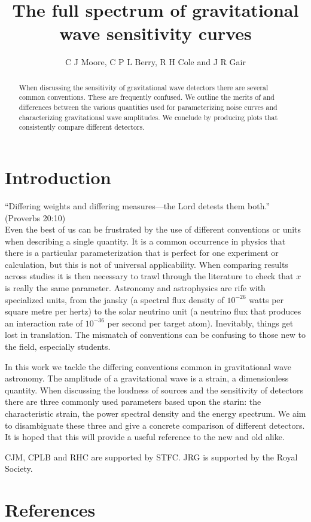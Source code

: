 \documentclass[12pt]{iopart}
\begin{document}
\title[GW sensitivity curves]{The full spectrum of gravitational wave sensitivity curves}

\author{C J Moore, C P L Berry, R H Cole and J R Gair}

\address{Institute of Astronomy, Madingley Road, Cambridge, CB3 0DS, United Kingdom}

\begin{abstract}
When discussing the sensitivity of gravitational wave detectors there are several common conventions. These are frequently confused. We outline the merits of and differences between the various quantities used for parameterizing noise curves and characterizing gravitational wave amplitudes. We conclude by producing plots that consistently compare different detectors.
\end{abstract}

\submitto{\CQG}
\maketitle

\section{Introduction}

``Differing weights and differing measures---the {\sc Lord} detests them both.'' (Proverbs 20:10)\\

\noindent{}Even the best of us can be frustrated by the use of different conventions or units when describing a single quantity. It is a common occurrence in physics that  there is a particular parameterization that is perfect for one experiment or calculation, but this is not of universal applicability. When comparing results across studies it is then necessary to trawl through the literature to check that $x$ is really the same parameter. Astronomy and astrophysics are rife with specialized units, from the jansky (a spectral flux density of $10^{-26}$ watts per square metre per hertz) to the solar neutrino unit (a neutrino flux that produces an interaction rate of $10^{-36}$ per second per target atom). Inevitably, things get lost in translation. The mismatch of conventions can be confusing to those new to the field, especially students.

In this work we tackle the differing conventions common in gravitational wave astronomy. The amplitude of a gravitational wave is a strain, a dimensionless quantity. When discussing the loudness of sources and the sensitivity of detectors there are three commonly used parameters based upon the starin: the characteristic strain, the power spectral density and the energy spectrum. We aim to disambiguate these three and give a concrete comparison of different detectors. It is hoped that this will provide a useful reference to the new and old alike. 

\ack
CJM, CPLB and RHC are supported by STFC. JRG is supported by the Royal Society.

\section*{References}
\end{document}
